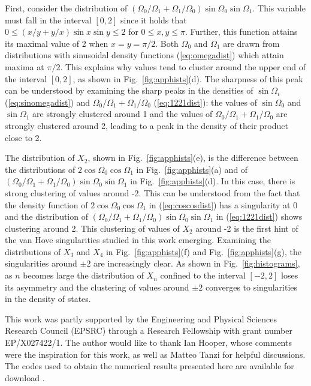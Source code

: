 \documentclass[nofootinbib,prb,amsmath,amssymb,twocolumn,floatfix]{revtex4-2}
\theoremstyle{definition}
\begin{document}
First, consider the distribution of $(\Omega_0/\Omega_1+\Omega_1/\Omega_0)\sin\Omega_0\sin\Omega_1$. This variable must fall in the interval $[0,2]$ since it holds that $0\leq (x/y+y/x)\sin x\sin y\leq 2$ for $0\leq x,y\leq\pi$. Further, this function attains its maximal value of 2 when $x=y=\pi/2$. Both $\Omega_0$ and $\Omega_1$ are drawn from distributions with sinusoidal density functions (\ref{eq:omegadist}) which attain maxima at $\pi/2$. This explains why values tend to cluster around the upper end of the interval $[0,2]$, as shown in Fig.~\ref{fig:apphists}(d). The sharpness of this peak can be understood by examining the sharp peaks in the densities of $\sin\Omega_i$ (\ref{eq:sinomegadist}) and $\Omega_0/\Omega_1+\Omega_1/\Omega_0$ (\ref{eq:1221dist}): the values of $\sin\Omega_0$ and $\sin\Omega_1$ are strongly clustered around 1 and the values of $\Omega_0/\Omega_1+\Omega_1/\Omega_0$ are strongly clustered around 2, leading to a peak in the density of their product close to 2.

The distribution of $X_2$, shown in Fig.~\ref{fig:apphists}(e), is the difference between the distributions of $2\cos\Omega_0\cos\Omega_1$ in Fig.~\ref{fig:apphists}(a) and of $(\Omega_0/\Omega_1+\Omega_1/\Omega_0)\sin\Omega_0\sin\Omega_1$ in Fig.~\ref{fig:apphists}(d). In this case, there is strong clustering of values around -2. This can be understood from the fact that the density function of $2\cos\Omega_0\cos\Omega_1$ in (\ref{eq:coscosdist}) has a singularity at 0 and the distribution of $(\Omega_0/\Omega_1+\Omega_1/\Omega_0)\sin\Omega_0\sin\Omega_1$ in (\ref{eq:1221dist}) shows clustering around 2. This clustering of values of $X_2$ around -2 is the first hint of the van Hove singularities studied in this work emerging. Examining the distributions of $X_3$ and $X_4$ in Fig.~\ref{fig:apphists}(f) and Fig.~\ref{fig:apphists}(g), the singularities around $\pm2$ are increasingly clear. As shown in Fig.~\ref{fig:histograms}, as $n$ becomes large the distribution of $X_n$ confined to the interval $[-2,2]$ loses its asymmetry and the clustering of values around $\pm2$ converges to singularities in the density of states.

\vspace{1em}

\begin{acknowledgments}
This work was partly supported by the Engineering and Physical Sciences Research Council (EPSRC) through a Research Fellowship with grant number EP/X027422/1. The author would like to thank Ian Hooper, whose comments were the inspiration for this work, as well as Matteo Tanzi for helpful discussions. The codes used to obtain the numerical results presented here are available for download \cite{mycode}. 
\end{acknowledgments}




\end{document}
